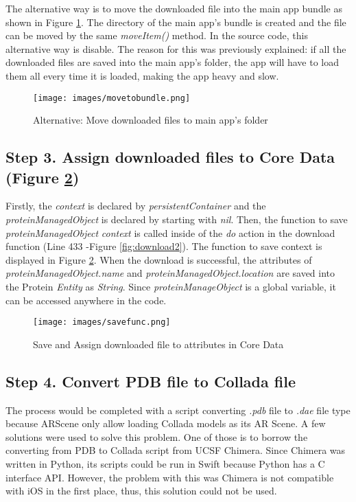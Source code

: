 The alternative way is to move the downloaded file into the main app bundle as shown in Figure \ref{fig:movetobundle}. The directory of the main app's bundle is created and the file can be moved by the same \emph{moveItem()} method. In the source code, this alternative way is disable. The reason for this was previously explained: if all the downloaded files are saved into the main app's folder, the app will have to load them all every time it is loaded, making the app heavy and slow. 
 \begin{figure}[!htp]
	\centering
	\texttt{[image: images/movetobundle.png]}
	\caption{Alternative: Move downloaded files to main app's folder}
	\label{fig:movetobundle}
\end{figure}


\subsection{Step 3. Assign downloaded files to Core Data (Figure \ref{fig:savefunc})}
Firstly, the \emph{context} is declared by \emph{persistentContainer} and the \emph{proteinManagedObject} is declared by starting with \emph{nil}. 
Then, the function to save \emph{proteinManagedObject} \emph{context} is called inside of the \emph{do} action in the download function (Line 433 -Figure \ref{fig:download2}). The function to save context is displayed in Figure \ref{fig:savefunc}. 
When the download is successful, the attributes of \emph{proteinManagedObject.name} and \emph{proteinManagedObject.location} are saved into the Protein \emph{Entity} as \emph{String}. 
Since \emph{proteinManageObject} is a global variable, it can be accessed anywhere in the code. 
 \begin{figure}[!htp]
	\centering
	\texttt{[image: images/savefunc.png]}
	\caption{Save and Assign downloaded file to attributes in Core Data}
	\label{fig:savefunc}
\end{figure}

\subsection{Step 4. Convert PDB file to Collada file}
The process would be completed with a script converting \emph{.pdb} file to \emph{.dae} file type because ARScene only allow loading Collada models as its AR Scene. 
A few solutions were used to solve this problem. One of those is to borrow the converting from PDB to Collada script from UCSF Chimera. Since Chimera was written in Python, its scripts could be run in Swift because Python has a C interface API. However, the problem with this was Chimera is not compatible with iOS in the first place, thus, this solution could not be used. 

